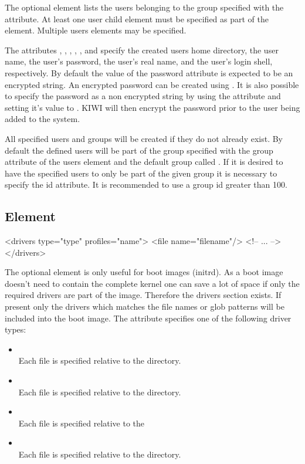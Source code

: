 The optional  element lists the users belonging to the group specified
with the  attribute. At least one user child element must be specified
as part of the  element. Multiple users elements may be specified.

The attributes , , , , 
, and  specify the created
users home directory, the user name, the user's password, the user's 
real name, and the user's login shell, respectively. By default the value
of the password attribute is expected to be an encrypted string. An
encrypted password can be created using . It
is also possible to specify the password as a non encrypted string by using
the  attribute and setting it's value to . KIWI will then
encrypt the password prior to the user being added to the system.

All specified users and groups will be created if they do not already exist.
By default the defined users will be part of the group specified with the 
group attribute of the users element and the default group called .
If it is desired to have the specified users to only be part of the given
group it is necessary to specify the id attribute. It is recommended to use
a group id greater than 100.

\subsection{ Element}
\begin{xml}
<drivers type="type" profiles="name">
  <file name="filename"/>
  <!-- ... -->
</drivers>
\end{xml}

The optional  element is only useful for boot images (initrd).
As a boot image doesn't need to contain the complete kernel one can
save a lot of space if only the required drivers are part of the image.
Therefore the drivers section exists. If present only the drivers which
matches the file names or glob patterns will be included into the
boot image. The  attribute specifies one of the following driver
types:

\begin{itemize}
\item {}\\
      Each file is specified relative to the
       directory.
\item {}\\
      Each file is specified relative to the
      directory.
\item {}\\
      Each file is specified relative to the
\item {}\\
      Each file is specified relative to the
       directory.
\end{itemize}

